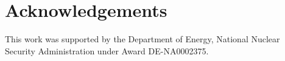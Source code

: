 \documentclass[review,3p]{elsarticle}
\begin{document}
\section{Acknowledgements}
This work was supported by the Department of Energy, National Nuclear Security Administration under Award DE-NA0002375.










\end{document}
